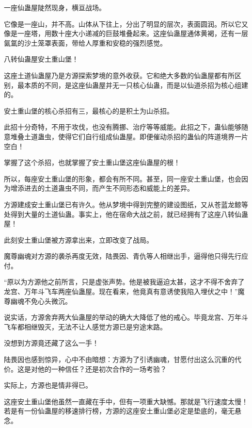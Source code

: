 
\begin{this_body}

一座仙蛊屋陡然现身，横亘战场。

它像是一座山，并不高。山体从下往上，分出了明显的层次，表面圆润。所以它又像是一座塔，用数十座大小递减的巨鼓堆叠起来。这座仙蛊屋通体黄褐，还有一层氤氲的沙土笼罩表面，带给人厚重和安稳的强烈感觉。

八转仙蛊屋安土重山堡！

这座土道仙蛊屋乃是方源探索梦境的意外收获。它和绝大多数的仙蛊屋都有所区别，最本质的不同，是这座仙蛊屋并无一只核心仙蛊，而是以仙道杀招为核心组建的。

安土重山堡的核心杀招有三，最核心的是积土为山杀招。

此招十分奇特，不用于攻伐，也没有腾挪、治疗等等威能。此招之下，蛊仙能够随意堆叠土道蛊虫，使得它们自行组成仙蛊屋。即便催动杀招的蛊仙的阵道境界一片空白！

掌握了这个杀招，也就掌握了安土重山堡这座仙蛊屋的根！

所以，每座安土重山堡的形象，都会有所不同。甚至，同一座安土重山堡，也会因为增添进去的土道蛊虫不同，而产生不同形态和威能上的差异。

方源建成安土重山堡已有许久。他从梦境中得到完整的建设图纸，又从苍蓝龙鲸等处得到大量的土道仙蛊。事实上，他在宿命大战之前，就已经拥有了这座八转仙蛊屋！

此刻安土重山堡被方源拿出来，立即改变了战局。

魔尊幽魂对方源的袭杀再度无效，陆畏因、青仇等人相继出手，逼得他只得先行应付。

“原以为方源他之前所言，只是虚张声势。他是被我逼迫太甚，这才不得不舍弃了龙宫、万年斗飞车两座仙蛊屋。现在看来，他竟真有意诱使我陷入埋伏之中！”魔尊幽魂不免心头微沉。

说实话，方源舍弃两大仙蛊屋的举动的确大大降低了他的戒心。毕竟龙宫、万年斗飞车都相继毁灭，无法不让人感觉方源已是穷途末路。

没想到方源竟还藏了这么一手！

陆畏因也感到惊异，心中不由暗想：方源为了引诱幽魂，甘愿付出这么沉重的代价。这是对他的一种信任？还是初次合作的一场考验？

实际上，方源也是情非得已。

这座安土重山堡他虽然一直藏在手中，但有一项重大缺憾。那就是飞行速度太慢！若是有一份仙蛊屋的移速排行榜，方源的这座安土重山堡必定是垫底的，毫无悬念。


\end{this_body}
